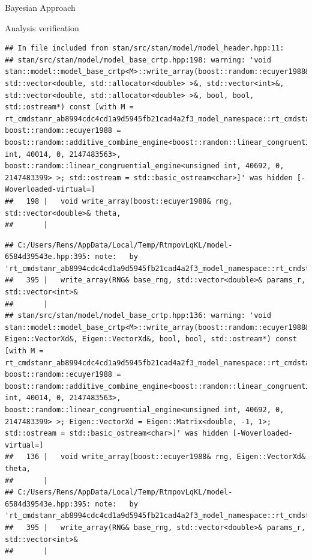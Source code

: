 \documentclass[
  ignorenonframetext,
]{beamer}
\begin{document}
\begin{frame}[fragile]{Bayesian Approach}
\begin{block}{Analysis verification}
\begin{verbatim}
## In file included from stan/src/stan/model/model_header.hpp:11:
## stan/src/stan/model/model_base_crtp.hpp:198: warning: 'void stan::model::model_base_crtp<M>::write_array(boost::random::ecuyer1988&, std::vector<double, std::allocator<double> >&, std::vector<int>&, std::vector<double, std::allocator<double> >&, bool, bool, std::ostream*) const [with M = rt_cmdstanr_ab8994cdc4cd1a9d5945fb21cad4a2f3_model_namespace::rt_cmdstanr_ab8994cdc4cd1a9d5945fb21cad4a2f3_model; boost::random::ecuyer1988 = boost::random::additive_combine_engine<boost::random::linear_congruential_engine<unsigned int, 40014, 0, 2147483563>, boost::random::linear_congruential_engine<unsigned int, 40692, 0, 2147483399> >; std::ostream = std::basic_ostream<char>]' was hidden [-Woverloaded-virtual=]
##   198 |   void write_array(boost::ecuyer1988& rng, std::vector<double>& theta,
##       |
\end{verbatim}

\begin{verbatim}
## C:/Users/Rens/AppData/Local/Temp/RtmpovLqKL/model-6584d39543e.hpp:395: note:   by 'rt_cmdstanr_ab8994cdc4cd1a9d5945fb21cad4a2f3_model_namespace::rt_cmdstanr_ab8994cdc4cd1a9d5945fb21cad4a2f3_model::write_array'
##   395 |   write_array(RNG& base_rng, std::vector<double>& params_r, std::vector<int>&
##       | 
## stan/src/stan/model/model_base_crtp.hpp:136: warning: 'void stan::model::model_base_crtp<M>::write_array(boost::random::ecuyer1988&, Eigen::VectorXd&, Eigen::VectorXd&, bool, bool, std::ostream*) const [with M = rt_cmdstanr_ab8994cdc4cd1a9d5945fb21cad4a2f3_model_namespace::rt_cmdstanr_ab8994cdc4cd1a9d5945fb21cad4a2f3_model; boost::random::ecuyer1988 = boost::random::additive_combine_engine<boost::random::linear_congruential_engine<unsigned int, 40014, 0, 2147483563>, boost::random::linear_congruential_engine<unsigned int, 40692, 0, 2147483399> >; Eigen::VectorXd = Eigen::Matrix<double, -1, 1>; std::ostream = std::basic_ostream<char>]' was hidden [-Woverloaded-virtual=]
##   136 |   void write_array(boost::ecuyer1988& rng, Eigen::VectorXd& theta,
##       | 
## C:/Users/Rens/AppData/Local/Temp/RtmpovLqKL/model-6584d39543e.hpp:395: note:   by 'rt_cmdstanr_ab8994cdc4cd1a9d5945fb21cad4a2f3_model_namespace::rt_cmdstanr_ab8994cdc4cd1a9d5945fb21cad4a2f3_model::write_array'
##   395 |   write_array(RNG& base_rng, std::vector<double>& params_r, std::vector<int>&
##       |
\end{verbatim}


\end{block}
\end{frame}
\end{document}
